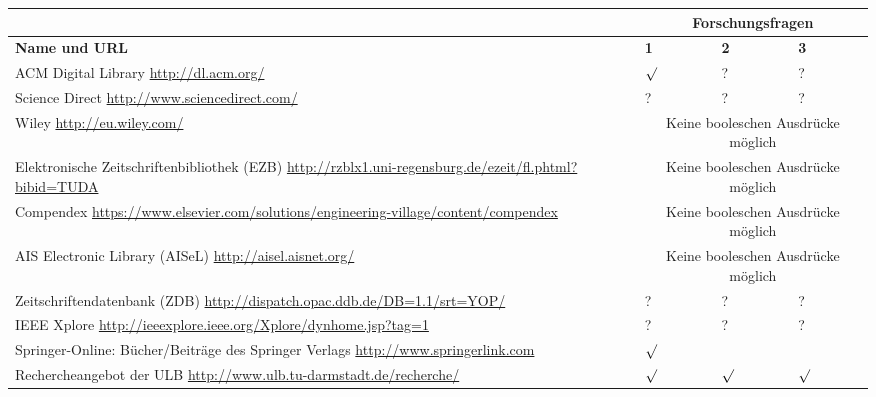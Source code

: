  \begin{table}[bh]
\centering
\begin{tabular}{|p{}|p{}|p{}|p{
}|}
\hline
  \hfill & \multicolumn{3}{c|}{\textbf{Forschungsfragen}} \\
  \hline
\textbf{Name und URL} & \textbf{1} & \textbf{2} & \textbf{3} \\
\hline
ACM Digital Library \newline \url{http://dl.acm.org/} & $\surd$ & ? & ? \\
	\hline
	Science Direct \newline \url{http://www.sciencedirect.com/} & ?& 
?& ?\\
	\hline
	Wiley \newline \url{http://eu.wiley.com/} & \multicolumn{3}{c|}{Keine 
booleschen Ausdrücke möglich} \\
	\hline
	Elektronische Zeitschriftenbibliothek (EZB)\newline
\url{http://rzblx1.uni-regensburg.de/ezeit/fl.phtml?bibid=TUDA} & 
\multicolumn{3}{c|}{Keine 
booleschen Ausdrücke möglich} \\
	\hline
	Compendex \newline
\url{https://www.elsevier.com/solutions/engineering-village/content/compendex} 
& \multicolumn{3}{c|}{Keine 
booleschen Ausdrücke möglich} \\
	\hline
	AIS Electronic Library (AISeL) \newline \url{http://aisel.aisnet.org/} & 
\multicolumn{3}{c|}{Keine 
booleschen Ausdrücke möglich} \\
	\hline
	Zeitschriftendatenbank (ZDB) \newline 
\url{http://dispatch.opac.ddb.de/DB=1.1/srt=YOP/} & ? & ? & ? \\
	\hline
	IEEE Xplore \newline 
	\url{http://ieeexplore.ieee.org/Xplore/dynhome.jsp?tag=1} & 
	? & ? & ? \\
	\hline
	Springer-Online: Bücher/Beiträge des Springer Verlags \newline
	\url{http://www.springerlink.com} & $\surd$ &  &  \\
	\hline
Rechercheangebot der ULB 
\newline \url{http://www.ulb.tu-darmstadt.de/recherche/} & $\surd$ & 
$\surd$ & $\surd$ \\
\hline
\end{tabular}


\end{table}
